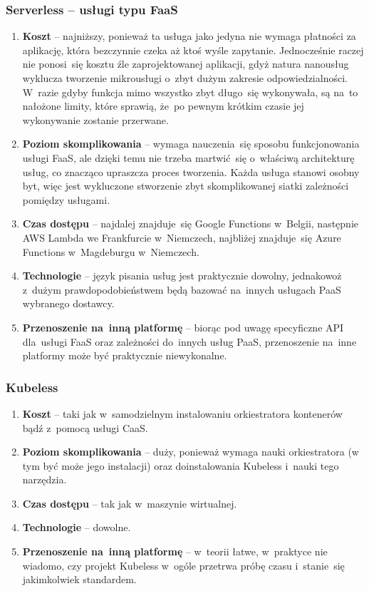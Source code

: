 \documentclass[12pt,a4paper,twoside,titlepage,openright]{book}
\begin{document}
\subsubsection{Serverless -- usługi typu FaaS}

\begin{enumerate}
	\item \textbf{Koszt} -- najniższy, ponieważ ta usługa jako jedyna nie wymaga płatności za aplikację, która bezczynnie czeka aż ktoś wyśle zapytanie. Jednocześnie raczej nie ponosi~się kosztu źle zaprojektowanej aplikacji, gdyż natura nanousług wyklucza tworzenie mikrousługi o~zbyt dużym zakresie odpowiedzialności. W~razie gdyby funkcja mimo wszystko zbyt długo~się wykonywała, są na~to nałożone limity, które sprawią, że~po pewnym krótkim czasie jej wykonywanie zostanie przerwane.
	\item \textbf{Poziom skomplikowania} -- wymaga nauczenia~się sposobu funkcjonowania usługi FaaS, ale dzięki temu nie trzeba martwić~się o~właściwą architekturę usług, co znacząco upraszcza proces tworzenia. Każda usługa stanowi osobny byt, więc jest wykluczone stworzenie zbyt skomplikowanej siatki zależności pomiędzy usługami.
	\item \textbf{Czas dostępu} -- najdalej znajduje~się Google Functions w~Belgii, następnie  AWS Lambda we Frankfurcie w~Niemczech, najbliżej znajduje~się Azure Functions w~Magdeburgu w~Niemczech.
	\item \textbf{Technologie} -- język pisania usług jest praktycznie dowolny, jednakowoż z~dużym prawdopodobieństwem będą bazować na~innych usługach PaaS wybranego dostawcy.
	\item \textbf{Przenoszenie na~inną platformę} -- biorąc pod uwagę specyficzne API dla~usługi FaaS oraz zależności do~innych usług PaaS, przenoszenie na~inne platformy może być praktycznie niewykonalne.
\end{enumerate}

\subsubsection{Kubeless}

\begin{enumerate}
	\item \textbf{Koszt} -- taki jak w~samodzielnym instalowaniu orkiestratora kontenerów bądź z~pomocą usługi CaaS.
	\item \textbf{Poziom skomplikowania} -- duży, ponieważ wymaga nauki orkiestratora (w tym być może jego instalacji) oraz doinstalowania Kubeless i~nauki tego narzędzia.
	\item \textbf{Czas dostępu} -- tak jak w~maszynie wirtualnej.
	\item \textbf{Technologie} -- dowolne.
	\item \textbf{Przenoszenie na~inną platformę} -- w~teorii łatwe, w~praktyce nie wiadomo, czy projekt Kubeless w~ogóle przetrwa próbę czasu i~stanie~się jakimkolwiek standardem.
\end{enumerate}
\end{document}
